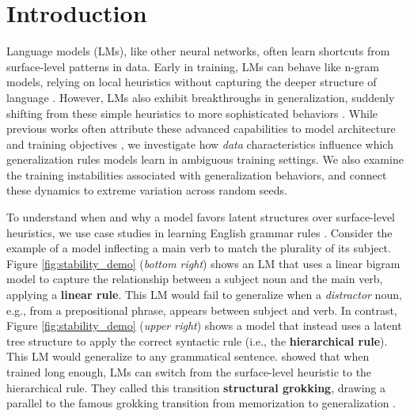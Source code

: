 \section{Introduction}
Language models (LMs), like other neural networks, often learn shortcuts from surface-level patterns in data. Early in training, LMs can behave like n-gram models, relying on local heuristics without capturing the deeper structure of language  \citep{Choshen2022-qj, Geirhos2020-ex, Saphra2018-xx}. However, LMs also exhibit breakthroughs in generalization, suddenly shifting from these simple heuristics to more sophisticated behaviors \citep{Choshen2022-qj, Chen2023-fi, McCoy2020-pj}. 
While previous works often attribute these advanced capabilities to model architecture and training objectives \citep{Ahuja2024-ul, McCoy2020-pj}, we investigate how \textit{data} characteristics influence which generalization rules models learn in ambiguous training settings. We also examine the training instabilities associated with generalization behaviors, and connect these dynamics to extreme variation across random seeds.


To understand when and why a model favors latent structures over surface-level heuristics, we use case studies in learning English grammar rules \cite{McCoyUnknown-uy}. 
Consider the example of a model inflecting a main verb to match the plurality of its subject. Figure \ref{fig:stability_demo} (\textit{bottom right}) shows an LM that uses a linear bigram model to capture the relationship between a subject noun and the main verb, applying a \textbf{linear rule}. This LM would fail to generalize when a \textit{distractor} noun, e.g., from a prepositional phrase, appears between subject and verb.
In contrast, Figure \ref{fig:stability_demo} (\textit{upper right}) shows a model that instead uses a latent tree structure to apply the correct syntactic rule (i.e., the \textbf{hierarchical rule}). This LM would generalize to any grammatical sentence. \citet{Murty2023-xp} showed that when trained long enough, LMs can switch from the surface-level heuristic to the hierarchical rule. They called this transition \textbf{structural grokking}, drawing a parallel to the famous grokking transition from memorization to generalization \citep{Power2022-hz}. 


